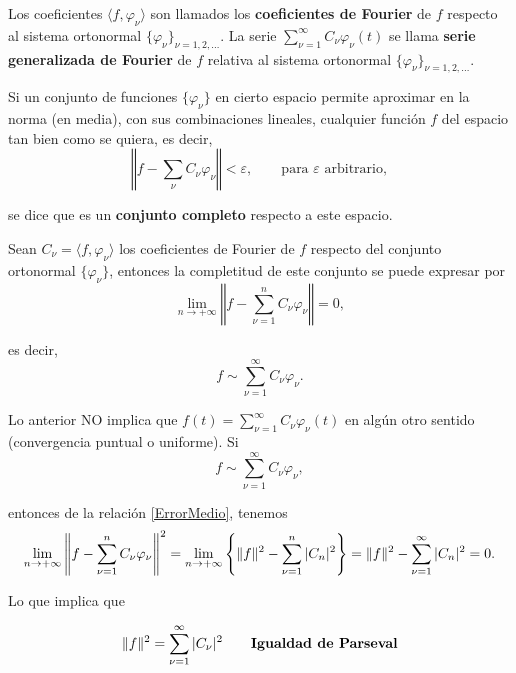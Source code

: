 \begin{defi}
Los coeficientes $\langle f , \varphi_{\nu}\rangle$ son llamados los \textbf{coeficientes de Fourier} de $f$  respecto al sistema ortonormal $\{\varphi_{\nu}\}_{\nu = 1,2, \dots}$. La serie $\sum\limits_{\nu = 1}^{\infty} C_{\nu} \varphi_{\nu}(t)$ se llama \textbf{serie generalizada de Fourier} de $f$ relativa al sistema ortonormal $\{\varphi_{\nu}\}_{\nu = 1,2, \dots}$.

\end{defi}

\begin{defi}
Si un conjunto de funciones $\{\varphi_{\nu}\}$ en cierto espacio permite aproximar en la norma (en media), con sus combinaciones lineales, cualquier función $f$ del espacio tan bien como se quiera, es decir,
$$\left\Vert f - \sum_{\nu} C_{\nu} \varphi_{\nu} \right\Vert< \varepsilon, \qquad \mbox{para $\varepsilon$ arbitrario},$$

se dice que es un \textbf{conjunto completo} respecto a este espacio.
\end{defi}

Sean $C_{\nu} = \langle f , \varphi_{\nu} \rangle$ los coeficientes de Fourier de $f$ respecto del conjunto ortonormal  $\{\varphi_{\nu}\}$, entonces la completitud de este conjunto se puede expresar por 
$$\lim_{n \to + \infty} \left\Vert f - \sum_{\nu =1}^{n} C_{\nu} \varphi_{\nu} \right\Vert = 0,$$

es decir, 
$$f \sim \sum_{\nu = 1}^{\infty} C_{\nu} \varphi_{\nu}.$$

Lo anterior NO implica que $f(t) = \sum\limits_{\nu = 1}^{\infty} C_{\nu} \varphi_{\nu}(t)$ en algún otro sentido (convergencia puntual o uniforme). Si
$$f \sim \sum_{\nu = 1}^{\infty} C_{\nu} \varphi_{\nu},$$

entonces de la relación \eqref{ErrorMedio}, tenemos 
\begin{equation*}
    \lim_{n \to + \infty} \left\Vert f - \sum_{\nu = 1}^n  C_{\nu} \varphi_{\nu} \right\Vert^2 = \lim_{n \to + \infty} \left\{ \Vert f \Vert^2 - \sum_{\nu = 1}^{n} |C_n|^2 \right\} = \lVert f\rVert^2  - \sum_{\nu = 1}^{\infty} |C_n|^2 = 0.
\end{equation*}

Lo que implica que
\begin{shaded}
 \begin{equation}
    \lVert f\rVert^2  = \sum_{\nu =1 }^{\infty} |C_{\nu}|^2 \qquad \mbox{\textbf{Igualdad de Parseval}}
\end{equation}   
\end{shaded}

